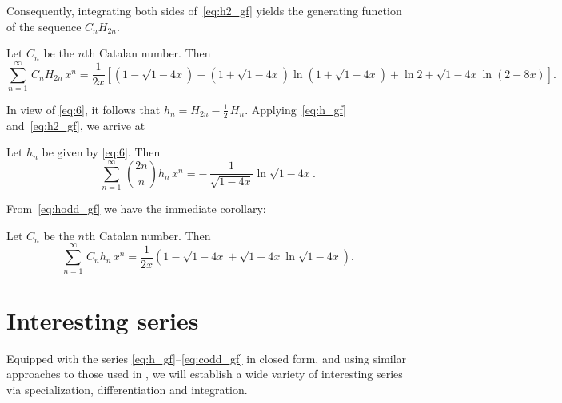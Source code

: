\documentclass[12pt,reqno]{article}
\begin{document}
Consequently, integrating both sides of~\eqref{eq:h2_gf} yields the generating function of the sequence $C_nH_{2n}$.

\begin{corollary} Let $C_n$ be the $n$th Catalan number. Then
\begin{equation}  
\label{eq:ch2_gf}
\sum_{n=1}^\infty\,C_nH_{2n}\,x^n =  \frac{1}{2x}\left[(1-\sqrt{1-4x}) - (1 + \sqrt{1 -4x})\ln(1+\sqrt{1 -4x}) + \ln 2 + \sqrt{1-4x}\ln(2-8x)\right]. 
\end{equation}
\end{corollary}

In view of \eqref{eq:6}, it follows that $h_n = H_{2n} - \frac{1}{2}\,H_n$. Applying~\eqref{eq:h_gf} and~\eqref{eq:h2_gf}, we arrive at

\begin{theorem} Let $h_n$ be given by \eqref{eq:6}. Then
\begin{equation}  
\sum_{n=1}^\infty\,\binom{2n}{n}h_n\,x^n =  -\,\frac{1}{\sqrt{1-4x}}\ln\sqrt{1-4x}. 
\label{eq:hodd_gf}
\end{equation}
\end{theorem}

From~\eqref{eq:hodd_gf} we have the immediate corollary:

\smallskip

\begin{corollary} Let $C_n$ be the $n$th Catalan number. Then
\begin{equation} 
\sum_{n=1}^\infty\,C_nh_{n}\,x^n =  \frac{1}{2x}\left(1-\sqrt{1-4x} + \sqrt{1-4x}\ln\sqrt{1-4x}\right).
\label{eq:codd_gf}
\end{equation}
\end{corollary}

\section{Interesting series}
\label{sec3}

Equipped with the series \eqref{eq:h_gf}--\eqref{eq:codd_gf} in closed form, and using similar approaches to those used in \cite{Chen, Lehmer}, we will establish a wide variety of interesting series via specialization, differentiation and integration.
\end{document}
